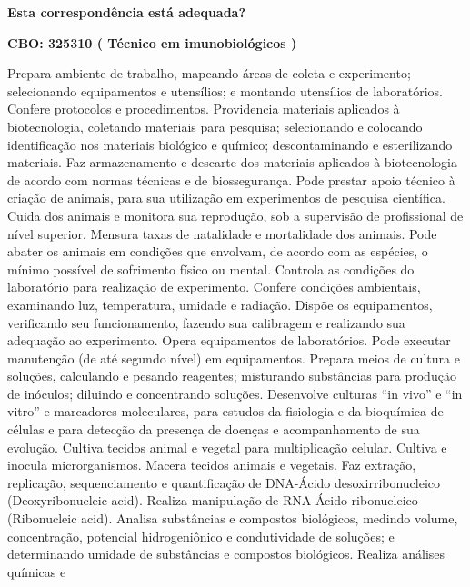 \documentclass[
]{article}
\begin{document}
\begin{Form}
\textbf{Esta correspondência está adequada?} \\ 
\end{Form}

\textbf{CBO: 325310  ( Técnico em imunobiológicos )}

Prepara ambiente de trabalho, mapeando áreas de coleta e experimento;
selecionando equipamentos e utensílios; e montando utensílios de
laboratórios. Confere protocolos e procedimentos. Providencia materiais
aplicados à biotecnologia, coletando materiais para pesquisa;
selecionando e colocando identificação nos materiais biológico e
químico; descontaminando e esterilizando materiais. Faz armazenamento e
descarte dos materiais aplicados à biotecnologia de acordo com normas
técnicas e de biossegurança. Pode prestar apoio técnico à criação de
animais, para sua utilização em experimentos de pesquisa científica.
Cuida dos animais e monitora sua reprodução, sob a supervisão de
profissional de nível superior. Mensura taxas de natalidade e
mortalidade dos animais. Pode abater os animais em condições que
envolvam, de acordo com as espécies, o mínimo possível de sofrimento
físico ou mental. Controla as condições do laboratório para realização
de experimento. Confere condições ambientais, examinando luz,
temperatura, umidade e radiação. Dispõe os equipamentos, verificando seu
funcionamento, fazendo sua calibragem e realizando sua adequação ao
experimento. Opera equipamentos de laboratórios. Pode executar
manutenção (de até segundo nível) em equipamentos. Prepara meios de
cultura e soluções, calculando e pesando reagentes; misturando
substâncias para produção de inóculos; diluindo e concentrando soluções.
Desenvolve culturas ``in vivo'' e ``in vitro'' e marcadores moleculares,
para estudos da fisiologia e da bioquímica de células e para detecção da
presença de doenças e acompanhamento de sua evolução. Cultiva tecidos
animal e vegetal para multiplicação celular. Cultiva e inocula
microrganismos. Macera tecidos animais e vegetais. Faz extração,
replicação, sequenciamento e quantificação de DNA-Ácido
desoxirribonucleico (Deoxyribonucleic acid). Realiza manipulação de
RNA-Ácido ribonucleico (Ribonucleic acid). Analisa substâncias e
compostos biológicos, medindo volume, concentração, potencial
hidrogeniônico e condutividade de soluções; e determinando umidade de
substâncias e compostos biológicos. Realiza análises químicas e
\end{document}
